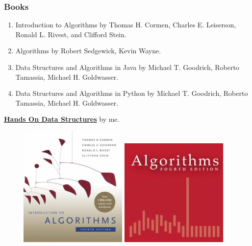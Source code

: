 \documentclass[aspectratio=169, 14pt]{beamer}
\begin{document}
\begin{frame}
    \frametitle{Books}
    \begin{enumerate}
        \item \alert{Introduction to Algorithms} by Thomas H. Cormen, Charles E. Leiserson, Ronald L. Rivest, and Clifford Stein.
        \item \alert{Algorithms} by Robert Sedgewick, Kevin Wayne.
        \item \alert{Data Structures and Algorithms in Java} by Michael T. Goodrich, Roberto Tamassia, Michael H. Goldwasser.
        \item \alert{Data Structures and Algorithms in Python} by Michael T. Goodrich, Roberto Tamassia, Michael H. Goldwasser.
    \end{enumerate}
    \pause
    \textbf{\href{https://chenzhongpu.github.io/data-structure-swufe/}{Hands On Data Structures}} by me.
\end{frame}

\begin{frame}
    \begin{figure}
        \includegraphics[width=0.475\textwidth]{week0/intro-to-alg}
        \hfill
        \includegraphics[width=0.475\textwidth]{week0/algs4}
    \end{figure} 
\end{frame}
\end{document}
